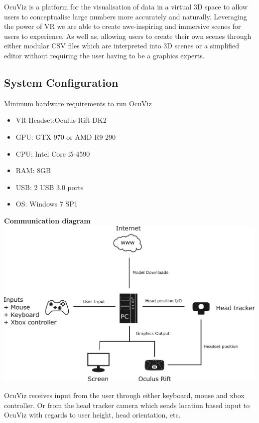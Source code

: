 \documentclass[a4paper,12pt]{article}
\newcommand\tab[1][1cm]{\hspace*{#1}}
\begin{document}
OcuViz is a platform for the visualisation of data in a virtual 3D space to allow users to conceptualise large numbers more accurately and naturally. Leveraging the power of VR we are able to create awe-inspiring and immersive scenes for users to experience. As well as, allowing users to create their own scenes through either modular CSV files which are interpreted into 3D scenes or a simplified editor without requiring the user having to be a graphics experts.

\subsection{System Configuration}

Minimum hardware requirements to run OcuViz
\begin{itemize}
\item VR Headset:\tab Oculus Rift DK2
\item GPU:\tab[2.1cm] GTX 970 or AMD R9 290
\item CPU:\tab[2.2cm] Intel Core i5-4590
\item RAM:\tab[2.1cm] 8GB
\item USB:\tab[2.3cm] 2 USB 3.0 ports
\item OS:\tab[2.6cm] Windows 7 SP1
\end{itemize}

\newpage

\textbf{Communication diagram} \\
\includegraphics[scale=0.1]{communication.png}

OcuViz receives input from the user through either keyboard, mouse and xbox controller. Or from the head tracker camera which sends location based input to OcuViz with regards to user height, head orientation, etc.
\end{document}

